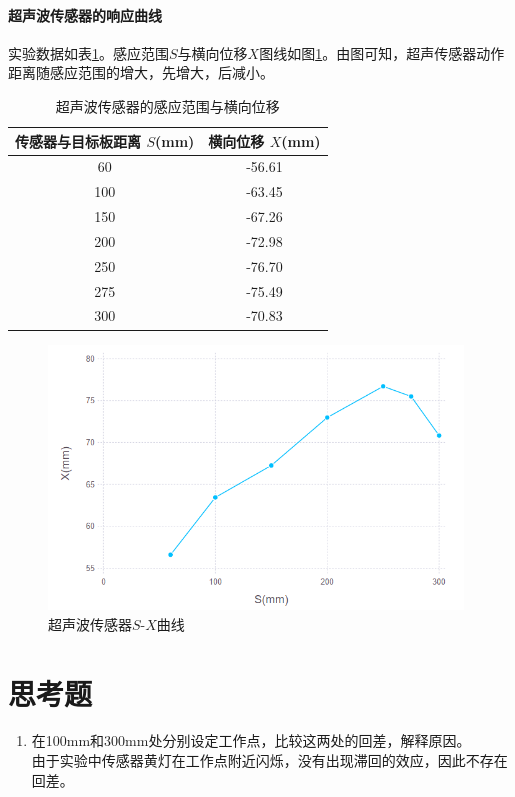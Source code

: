 \paragraph{超声波传感器的响应曲线}
实验数据如表\ref{tab:lh}。感应范围$S$与横向位移$X$图线如图\ref{fig:lsx}。由图可知，超声传感器动作距离随感应范围的增大，先增大，后减小。
\begin{table}[htbp]
	\centering
	\begin{tabular}{|c|c|}
		\hline
		传感器与目标板距离 $S$(mm) & 横向位移 $X$(mm) \\
		\hline
		60 & -56.61 \\
		100 & -63.45 \\
		150 & -67.26 \\
		200 & -72.98 \\
		250 & -76.70 \\
		275 & -75.49 \\
		300 & -70.83 \\
		\hline
	\end{tabular}
	\caption{超声波传感器的感应范围与横向位移}
	\label{tab:lh}
\end{table}

\begin{figure}[htbp]
\centering
\includegraphics[width=11cm]{resource/lsx.png}
\caption{超声波传感器$S$-$X$曲线}
\label{fig:lsx}
\end{figure}


\section{思考题}
\begin{enumerate}
\item 在100mm和300mm处分别设定工作点，比较这两处的回差，解释原因。\\
由于实验中传感器黄灯在工作点附近闪烁，没有出现滞回的效应，因此不存在回差。
\end{enumerate}

